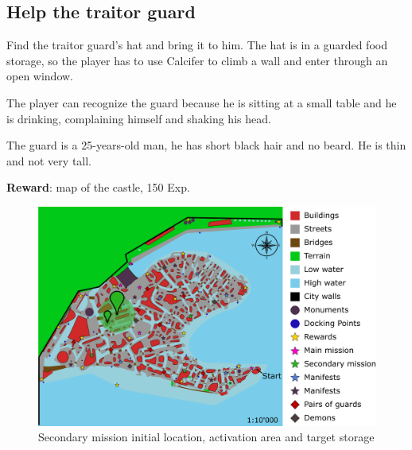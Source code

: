 \subsection{Help the traitor guard}
Find the traitor guard's hat and bring it to him. The hat is in a guarded food storage, so the player has to use Calcifer to climb a wall and enter through an open window.

The player can recognize the guard because he is sitting at a small table and he is drinking, complaining himself and shaking his head.

The guard is a 25-years-old man, he has short black hair and no beard. He is thin and not very tall.

\textbf{Reward}: map of the castle, 150 Exp.

\begin{figure}[H]
  \centering
  \includegraphics[width=\textwidth]{../Images/Maps/dynamiaSecondaryMissions_Guard}
  \caption{Secondary mission initial location, activation area and target storage}
\end{figure}

